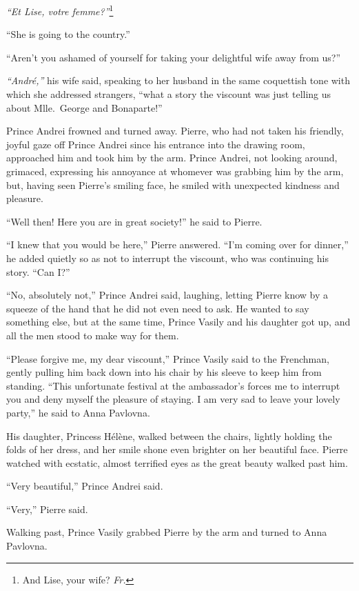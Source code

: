 \textit{``Et Lise, votre femme?''}\footnote{And Lise, your wife? \textit{Fr.}} %

``She is going to the country.'' %

``Aren't you ashamed of yourself for taking your delightful wife away from us?'' %

\textit{``Andr\'e,''} his wife said, speaking to her husband in the same coquettish tone with which she addressed strangers, ``what a story the viscount was just telling us about Mlle.~George and Bonaparte!'' %

Prince Andrei frowned and turned away. Pierre, who had not taken his friendly, joyful gaze off Prince Andrei since his entrance into the drawing room, approached him and took him by the arm. Prince Andrei, not looking around, grimaced, expressing his annoyance at whomever was grabbing him by the arm, but, having seen Pierre's smiling face, he smiled with unexpected kindness and pleasure.

``Well then! Here you are in great society!'' he said to Pierre. %

``I knew that you would be here,'' Pierre answered. ``I'm coming over for dinner,'' he added quietly so as not to interrupt the viscount, who was continuing his story. ``Can I?'' %

``No, absolutely not,'' Prince Andrei said, laughing, letting Pierre know by a squeeze of the hand that he did not even need to ask. He wanted to say something else, but at the same time, Prince Vasily and his daughter got up, and all the men stood to make way for them. %

``Please forgive me, my dear viscount,'' Prince Vasily said to the Frenchman, gently pulling him back down into his chair by his sleeve to keep him from standing. ``This unfortunate festival at the ambassador's forces me to interrupt you and deny myself the pleasure of staying. I am very sad to leave your lovely party,'' he said to Anna Pavlovna. %

His daughter, Princess H\'el\`ene, walked between the chairs, lightly holding the folds of her dress, and her smile shone even brighter on her beautiful face. Pierre watched with ecstatic, almost terrified eyes as the great beauty walked past him.

``Very beautiful,'' Prince Andrei said. %

``Very,'' Pierre said. %

Walking past, Prince Vasily grabbed Pierre by the arm and turned to Anna Pavlovna.


